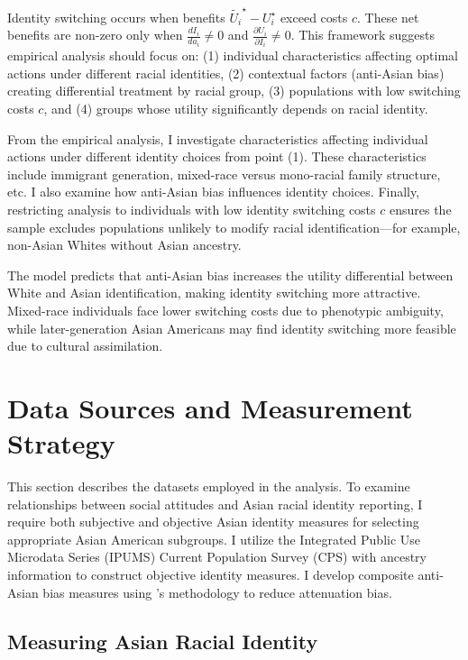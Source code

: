 Identity switching occurs when benefits $\tilde{U_{i}}^{\star} - U_{i}^{\star}$ exceed costs $c$. These net benefits are non-zero only when $\frac{d I_i}{d a_i} \neq 0$ and $\frac{\partial U_i}{\partial I_i} \neq 0$. This framework suggests empirical analysis should focus on: (1) individual characteristics affecting optimal actions under different racial identities, (2) contextual factors (anti-Asian bias) creating differential treatment by racial group, (3) populations with low switching costs $c$, and (4) groups whose utility significantly depends on racial identity.

From the empirical analysis, I investigate characteristics affecting individual actions under different identity choices from point (1). These characteristics include immigrant generation, mixed-race versus mono-racial family structure, etc. I also examine how anti-Asian bias influences identity choices. Finally, restricting analysis to individuals with low identity switching costs $c$ ensures the sample excludes populations unlikely to modify racial identification—for example, non-Asian Whites without Asian ancestry.

The model predicts that anti-Asian bias increases the utility differential between White and Asian identification, making identity switching more attractive. Mixed-race individuals face lower switching costs due to phenotypic ambiguity, while later-generation Asian Americans may find identity switching more feasible due to cultural assimilation.

\section{Data Sources and Measurement Strategy}\label{sec:data}

This section describes the datasets employed in the analysis. To examine relationships between social attitudes and Asian racial identity reporting, I require both subjective and objective Asian identity measures for selecting appropriate Asian American subgroups. I utilize the Integrated Public Use Microdata Series (IPUMS) Current Population Survey (CPS) \autocite{floodsarahIntegratedPublicUse2021a} with ancestry information to construct objective identity measures. I develop composite anti-Asian bias measures using \textcite{lubotskyInterpretationRegressionsMultiple2006}'s methodology to reduce attenuation bias.

\subsection{Measuring Asian Racial Identity}\label{subsec:cps}

